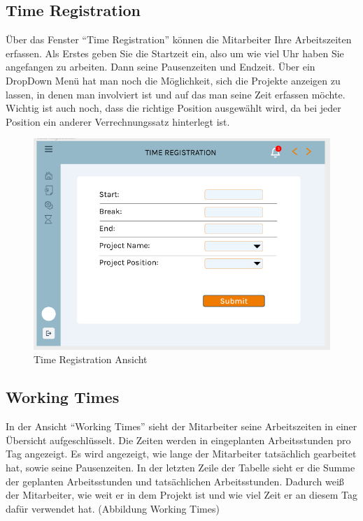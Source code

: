 \documentclass{article}
\begin{document}
\newpage
\subsection{Time Registration}
Über das Fenster “Time Registration” können die Mitarbeiter Ihre Arbeitszeiten erfassen.  Als Erstes geben Sie die Startzeit ein, also um wie viel Uhr haben Sie angefangen zu arbeiten. Dann seine Pausenzeiten und Endzeit. Über ein DropDown Menü hat man noch die Möglichkeit, sich die Projekte anzeigen zu lassen, in denen man involviert ist und auf das man seine Zeit erfassen möchte. Wichtig ist auch noch, dass die richtige Position ausgewählt wird, da bei jeder Position ein anderer Verrechnungssatz hinterlegt ist. 
         \begin{figure}[h]
            \includegraphics[height= 0.5\textwidth,width= \textwidth]{images/Time Registration.png}
            \caption{Time Registration Ansicht}
            \label{fig:beispiel}
        \end{figure}

        \subsection{Working Times}
        In der Ansicht “Working Times” sieht der Mitarbeiter seine Arbeitszeiten in einer Übersicht aufgeschlüsselt. Die Zeiten werden in eingeplanten Arbeitsstunden pro Tag angezeigt. Es wird angezeigt, wie lange der Mitarbeiter tatsächlich gearbeitet hat, sowie seine Pausenzeiten. In der letzten Zeile der Tabelle sieht er die Summe der geplanten Arbeitsstunden und tatsächlichen Arbeitsstunden. Dadurch weiß der Mitarbeiter, wie weit er in dem Projekt ist und wie viel Zeit er an diesem Tag dafür verwendet hat. (Abbildung Working Times)
\end{document}
